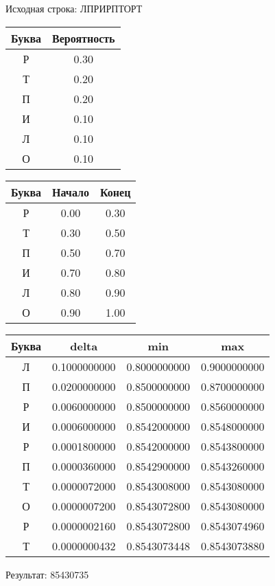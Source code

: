 \documentclass[a4paper, 12pt]{article}
\begin{document}
Исходная строка: ЛПРИРПТОРТ\
\begin{center}
 \begin{tabular}{ |c|c| } 
  \hline
     Буква & Вероятность \\ \hline
Р & 0.30\\\hline
Т & 0.20\\\hline
П & 0.20\\\hline
И & 0.10\\\hline
Л & 0.10\\\hline
О & 0.10
\\ \hline \end{tabular}
\end{center}
\begin{center}
 \begin{tabular}{ |c|c|c| } 
  \hline
     Буква & Начало & Конец \\ \hline
Р & 0.00 & 0.30\\\hline
Т & 0.30 & 0.50\\\hline
П & 0.50 & 0.70\\\hline
И & 0.70 & 0.80\\\hline
Л & 0.80 & 0.90\\\hline
О & 0.90 & 1.00
\\ \hline \end{tabular}
\end{center}
\begin{center}
 \begin{tabular}{ |c|c|c|c| } 
  \hline
     Буква & delta & min & max \\ \hline
Л & 0.1000000000 & 0.8000000000 & 0.9000000000\\\hline
П & 0.0200000000 & 0.8500000000 & 0.8700000000\\\hline
Р & 0.0060000000 & 0.8500000000 & 0.8560000000\\\hline
И & 0.0006000000 & 0.8542000000 & 0.8548000000\\\hline
Р & 0.0001800000 & 0.8542000000 & 0.8543800000\\\hline
П & 0.0000360000 & 0.8542900000 & 0.8543260000\\\hline
Т & 0.0000072000 & 0.8543008000 & 0.8543080000\\\hline
О & 0.0000007200 & 0.8543072800 & 0.8543080000\\\hline
Р & 0.0000002160 & 0.8543072800 & 0.8543074960\\\hline
Т & 0.0000000432 & 0.8543073448 & 0.8543073880
\\ \hline \end{tabular}
\end{center}
Результат: 85430735
\pagebreak
\end{document}
